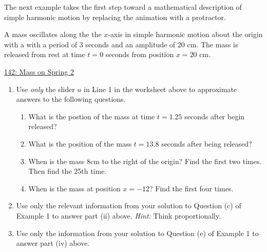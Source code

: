\documentclass{ximera}
\begin{document}
The next example takes the first step toward a mathematical description of simple harmonic motion by replacing the animation with a protractor.

\begin{example}  \label{Ex:PDoEr3rdfsx}
A mass oscillates along the the $x$-axis in simple harmonic motion  about the origin  with a with a period of $3$ seconds and an amplitude of $20$ cm. The mass is released from rest at time $t=0$ seconds from position $x=20$ cm.

\begin{onlineOnly}
    \begin{center}
\end{center}
\end{onlineOnly}

\href{https://www.desmos.com/calculator/rqdenajviu}{142: Mass on Spring 2 }

\begin{enumerate}

\item Use \emph{only} the slider $u$ in Line 1 in the worksheet above to approximate answers to the following questions.

\begin{enumerate}
\item What is the postion of the mass at time $t=1.25$ seconds after begin released?

\item What is the position of the mass $t=13.8$ seconds after being released?

\item When is the mass $8$cm to the right of the origin? Find the first two times. Then find the 25th time.

\item When is the mass  at position $x = -12$? Find the first four times.  
\end{enumerate}

\item Use only the relevant information from your solution to Question (c) of Example 1 to answer part (ii) above. \emph{Hint:} Think proportionally.

\item Use only the information from your solution to Question (e) of Example 1 to answer part (iv) above.


\end{enumerate}

\end{example}
\end{document}
